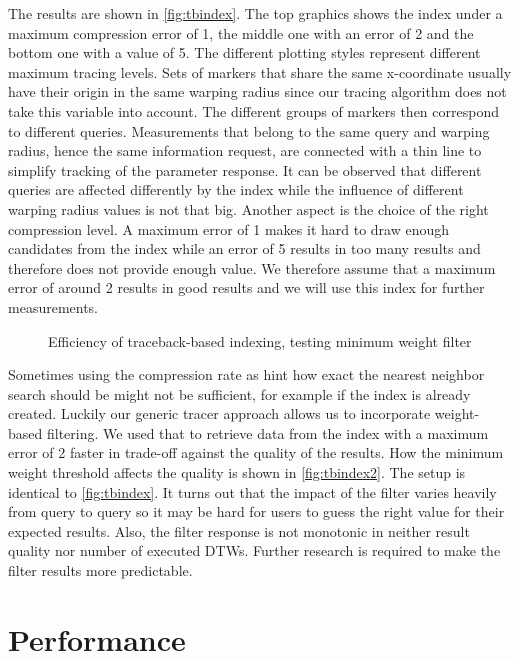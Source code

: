 The results are shown in \autoref{fig:tbindex}. The top graphics shows the index under a maximum compression error of \num{1}, the middle one with an error of \num{2} and the bottom one with a value of \num{5}. The different plotting styles represent different maximum tracing levels. Sets of markers that share the same x-coordinate usually have their origin in the same warping radius since our tracing algorithm does not take this variable into account. The different groups of markers then correspond to different queries. Measurements that belong to the same query and warping radius, hence the same information request, are connected with a thin line to simplify tracking of the parameter response. It can be observed that different queries are affected differently by the index while the influence of different warping radius values is not that big. Another aspect is the choice of the right compression level. A maximum error of \num{1} makes it hard to draw enough candidates from the index while an error of \num{5} results in too many results and therefore does not provide enough value. We therefore assume that a maximum error of around \num{2} results in good results and we will use this index for further measurements.

\begin{figure}
    \centering
    
    \caption[Efficiency of tracer, testing minimum weight filter]{Efficiency of traceback-based indexing, testing minimum weight filter}\label{fig:tbindex2}
\end{figure}

Sometimes using the compression rate as hint how exact the nearest neighbor search should be might not be sufficient, for example if the index is already created. Luckily our generic tracer approach allows us to incorporate weight-based filtering. We used that to retrieve data from the index with a maximum error of \num{2} faster in trade-off against the quality of the results. How the minimum weight threshold affects the quality is shown in \autoref{fig:tbindex2}. The setup is identical to \autoref{fig:tbindex}. It turns out that the impact of the filter varies heavily from query to query so it may be hard for users to guess the right value for their expected results. Also, the filter response is not monotonic in neither result quality nor number of executed DTWs. Further research is required to make the filter results more predictable.



\section{Performance}
\label{sec:evaluation:perf}

